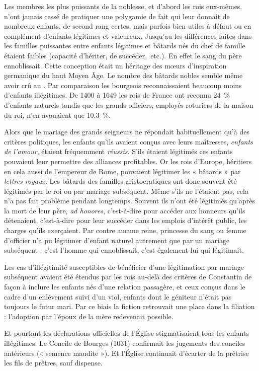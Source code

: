  Les membres les plus puissants de la noblesse, et d'abord les rois eux-mêmes, n'ont jamais cessé de pratiquer une polygamie de fait qui leur donnait de nombreux enfants, de second rang certes, mais parfois bien utiles à défaut ou en complément d'enfants légitimes et valeureux. Jusqu'au  les différences faites dans les familles puissantes entre enfants légitimes et bâtards nés du chef de famille étaient faibles (capacité d'hériter, de succéder,~etc.). En effet le sang du père ennoblissait. Cette conception était un héritage des mœurs d'inspiration germanique du haut Moyen Âge. Le nombre des bâtards nobles semble même avoir crû au  . Par comparaison les bourgeois reconnaissaient beaucoup moins d'enfants illégitimes. De 1400 à 1649 les rois de France ont reconnu 24~\% d'enfants naturels tandis que les grands officiers, employés roturiers de la maison du roi, n'en avouaient que 10,3~\%. 

 Alors que le mariage des grands seigneurs ne répondait habituellement qu'à des critères politiques, les enfants qu'ils avaient conçus avec leurs maîtresses, \emph{enfants de l'amour}, étaient fréquemment \emph{réussis}. S'ils étaient légitimés ces enfants pouvaient leur permettre des alliances profitables. Or les rois d'Europe, héritiers en cela aussi de l'empereur de Rome, pouvaient légitimer les « bâtards » par \emph{lettres royaux}. Les bâtards des familles aristocratiques ont donc souvent été légitimés par le roi ou par mariage subséquent. Même s'ils ne l'étaient pas, cela n'a pas fait problème pendant longtemps. Souvent ils n'ont été légitimés qu'après la mort de leur père, \emph{ad honores}, c'est-à-dire pour accéder aux honneurs qu'ils détenaient, c'est-à-dire pour leur succéder dans les emplois d'intérêt public, les charges qu'ils exerçaient. Par contre aucune reine, princesse du sang ou femme d'officier n'a pu légitimer d'enfant naturel autrement que par un mariage subséquent : c'est l'homme qui ennoblissait, c'est également lui qui légitimait. 

 Les cas d'illégitimité susceptibles de bénéficier d'une légitimation par mariage subséquent avaient été étendus par les rois au-delà des critères de Constantin de façon à inclure les enfants nés d'une relation passagère, et ceux conçus dans le cadre d'un enlèvement suivi d'un viol, enfants dont le géniteur n'était pas toujours le futur mari. Par ce biais la fiction retrouvait une place dans la filiation : l'adoption par l'époux de la mère redevenait possible. 

 Et pourtant les déclarations officielles de l'Église stigmatisaient tous les enfants illégitimes. Le Concile de Bourges (1031) confirmait les jugements des conciles antérieurs (« semence maudite »). Et l'Église continuait d'écarter de la prêtrise les fils de prêtres, sauf dispense. 

